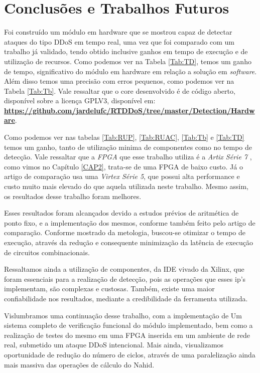 \chapter[Conclusões e Trabalhos Futuros]{Conclusões e Trabalhos Futuros}


Foi construído um módulo em hardware que se mostrou capaz de detectar ataques do tipo DDoS em tempo real, uma vez que foi comparado com um trabalho já validado, tendo obtido inclusive ganhos em tempo de execução e de utilização de recursos. Como podemos ver na Tabela \ref{Tab:TD}, temos um ganho de tempo, significativo do módulo em hardware em relação a solução em \textit{software}. Além disso temos uma precisão com erros pequenos, como podemos ver na Tabela \ref{Tab:Tb}. Vale ressaltar que o core desenvolvido é de código aberto, disponível sobre a licença GPLV3, disponível em: \textbf{\url{https://github.com/jardelufc/RTDDoS/tree/master/Detection/Hardware}}.

Como podemos ver nas tabelas \ref{Tab:RUP}, \ref{Tab:RUAC}, \ref{Tab:Tb} e \ref{Tab:TD} temos um ganho, tanto de utilização minima de componentes como no tempo de detecção. Vale ressaltar que a \textit{FPGA} que esse trabalho utiliza é a \textit{Artix Série 7} , como vimos no Capítulo \ref{CAP2}, trata-se de uma FPGA de baixo custo. Já o artigo de comparação usa uma \textit{Virtex Série 5}, que possui alta performance e custo muito mais elevado do que aquela utilizada neste trabalho. Mesmo assim, os resultados desse trabalho foram melhores.

Esses resultados foram alcançados devido a estudos prévios de aritmética de ponto fixo,  e a implementação dos mesmos, conforme também feito pelo artigo de comparação. Conforme mostrado da metologia, buscou-se otimizar o tempo de execução, através da redução e consequente  minimização da latência de execução de circuitos combinacionais.
	
Ressaltamos ainda a utilização de componentes, da IDE vivado da Xilinx, que foram essenciais para a realização de detecção, pois as operações que esses ip's implementam, são complexas e custosas. Também, existe uma maior confiabilidade nos resultados, mediante a credibilidade da ferramenta utilizada.

Vislumbramos uma continuação desse trabalho, com a implementação de Um sistema completo de verificação funcional do módulo implementado, bem como a realização de testes do mesmo em uma FPGA inserida em um ambiente de rede real, submetido um ataque DDoS intencional. Mais ainda, visualizamos oportunidade de redução do número de ciclos, através de uma paralelização ainda mais massiva das operações de cálculo do Nahid. 


